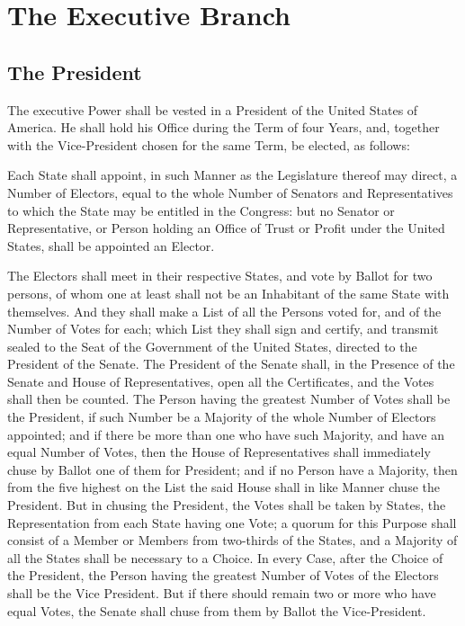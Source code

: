 \documentclass{constitution}
\begin{document}
\chapter{The Executive Branch}
\section{The President}
The executive Power shall be vested in a President of the United States of America.
He shall hold his Office during the Term of four Years,
and, together with the Vice-President chosen for the same Term,
be elected, as follows:

Each State shall appoint,
in such Manner as the Legislature thereof may direct,
a Number of Electors, equal to the whole Number of Senators and Representatives
to which the State may be entitled in the Congress:
but no Senator or Representative,
or Person holding an Office of Trust or Profit under the United States,
shall be appointed an Elector.

The Electors shall meet in their respective States, and vote by Ballot for two persons,
of whom one at least shall not be an Inhabitant of the same State with themselves.
And they shall make a List of all the Persons voted for, and of the Number of Votes for each;
which List they shall sign and certify,
and transmit sealed to the Seat of the Government of the United States,
directed to the President of the Senate.
The President of the Senate shall,
in the Presence of the Senate and House of Representatives,
open all the Certificates, and the Votes shall then be counted.
The Person having the greatest Number of Votes shall be the President,
if such Number be a Majority of the whole Number of Electors appointed;
and if there be more than one who have such Majority, and have an equal Number of Votes,
then the House of Representatives shall immediately chuse by Ballot one of them for President;
and if no Person have a Majority,
then from the five highest on the List the said House shall in like Manner chuse the President.
But in chusing the President, the Votes shall be taken by States,
the Representation from each State having one Vote;
a quorum for this Purpose shall consist of a Member or Members from two-thirds of the States,
and a Majority of all the States shall be necessary to a Choice.
In every Case, after the Choice of the President,
the Person having the greatest Number of Votes of the Electors shall be the Vice President.
But if there should remain two or more who have equal Votes,
the Senate shall chuse from them by Ballot the Vice-President.
\end{document}
